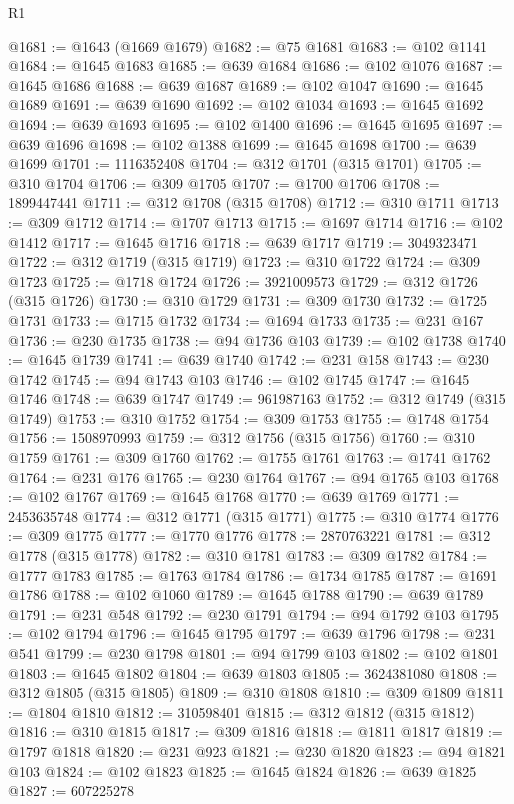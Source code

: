 \begin{lexlean}{R1}
\begin{coremodule}
@1681 := @1643 (@1669 @1679)
@1682 := @75 @1681
@1683 := @102 @1141
@1684 := @1645 @1683
@1685 := @639 @1684
@1686 := @102 @1076
@1687 := @1645 @1686
@1688 := @639 @1687
@1689 := @102 @1047
@1690 := @1645 @1689
@1691 := @639 @1690
@1692 := @102 @1034
@1693 := @1645 @1692
@1694 := @639 @1693
@1695 := @102 @1400
@1696 := @1645 @1695
@1697 := @639 @1696
@1698 := @102 @1388
@1699 := @1645 @1698
@1700 := @639 @1699
@1701 := 1116352408
@1704 := @312 @1701 (@315 @1701)
@1705 := @310 @1704
@1706 := @309 @1705
@1707 := @1700 @1706
@1708 := 1899447441
@1711 := @312 @1708 (@315 @1708)
@1712 := @310 @1711
@1713 := @309 @1712
@1714 := @1707 @1713
@1715 := @1697 @1714
@1716 := @102 @1412
@1717 := @1645 @1716
@1718 := @639 @1717
@1719 := 3049323471
@1722 := @312 @1719 (@315 @1719)
@1723 := @310 @1722
@1724 := @309 @1723
@1725 := @1718 @1724
@1726 := 3921009573
@1729 := @312 @1726 (@315 @1726)
@1730 := @310 @1729
@1731 := @309 @1730
@1732 := @1725 @1731
@1733 := @1715 @1732
@1734 := @1694 @1733
@1735 := @231 @167
@1736 := @230 @1735
@1738 := @94 @1736 @103
@1739 := @102 @1738
@1740 := @1645 @1739
@1741 := @639 @1740
@1742 := @231 @158
@1743 := @230 @1742
@1745 := @94 @1743 @103
@1746 := @102 @1745
@1747 := @1645 @1746
@1748 := @639 @1747
@1749 := 961987163
@1752 := @312 @1749 (@315 @1749)
@1753 := @310 @1752
@1754 := @309 @1753
@1755 := @1748 @1754
@1756 := 1508970993
@1759 := @312 @1756 (@315 @1756)
@1760 := @310 @1759
@1761 := @309 @1760
@1762 := @1755 @1761
@1763 := @1741 @1762
@1764 := @231 @176
@1765 := @230 @1764
@1767 := @94 @1765 @103
@1768 := @102 @1767
@1769 := @1645 @1768
@1770 := @639 @1769
@1771 := 2453635748
@1774 := @312 @1771 (@315 @1771)
@1775 := @310 @1774
@1776 := @309 @1775
@1777 := @1770 @1776
@1778 := 2870763221
@1781 := @312 @1778 (@315 @1778)
@1782 := @310 @1781
@1783 := @309 @1782
@1784 := @1777 @1783
@1785 := @1763 @1784
@1786 := @1734 @1785
@1787 := @1691 @1786
@1788 := @102 @1060
@1789 := @1645 @1788
@1790 := @639 @1789
@1791 := @231 @548
@1792 := @230 @1791
@1794 := @94 @1792 @103
@1795 := @102 @1794
@1796 := @1645 @1795
@1797 := @639 @1796
@1798 := @231 @541
@1799 := @230 @1798
@1801 := @94 @1799 @103
@1802 := @102 @1801
@1803 := @1645 @1802
@1804 := @639 @1803
@1805 := 3624381080
@1808 := @312 @1805 (@315 @1805)
@1809 := @310 @1808
@1810 := @309 @1809
@1811 := @1804 @1810
@1812 := 310598401
@1815 := @312 @1812 (@315 @1812)
@1816 := @310 @1815
@1817 := @309 @1816
@1818 := @1811 @1817
@1819 := @1797 @1818
@1820 := @231 @923
@1821 := @230 @1820
@1823 := @94 @1821 @103
@1824 := @102 @1823
@1825 := @1645 @1824
@1826 := @639 @1825
@1827 := 607225278

\end{coremodule}
\end{lexlean}
